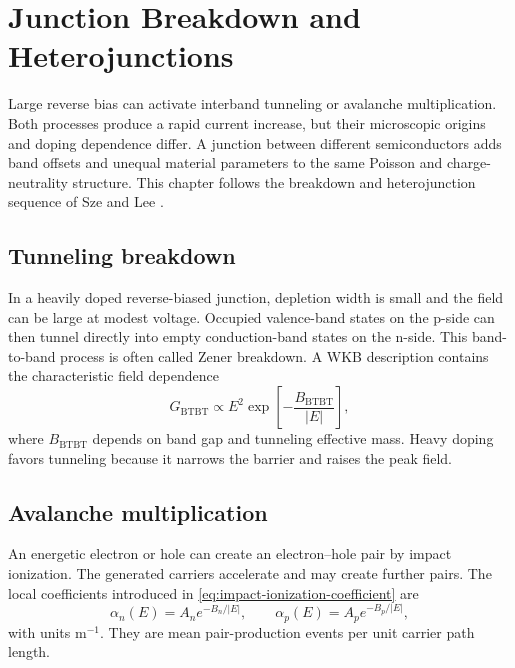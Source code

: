 \chapter{Junction Breakdown and Heterojunctions}
\label{ch:breakdown-heterojunctions}

Large reverse bias can activate interband tunneling or avalanche multiplication.
Both processes produce a rapid current increase, but their microscopic origins
and doping dependence differ.  A junction between different semiconductors adds
band offsets and unequal material parameters to the same Poisson and charge-
neutrality structure.  This chapter follows the breakdown and heterojunction
sequence of Sze and Lee \cite[Chap.~3, Secs.~3.6--3.7]{szeLee2012}.

\section{Tunneling breakdown}

In a heavily doped reverse-biased junction, depletion width is small and the
field can be large at modest voltage.  Occupied valence-band states on the
p-side can then tunnel directly into empty conduction-band states on the
n-side.  This band-to-band process is often called Zener breakdown.  A
WKB description contains the characteristic field dependence
\begin{equation}
 G_{\mathrm{BTBT}}\propto E^2
 \exp\left[-\frac{B_{\mathrm{BTBT}}}{|E|}\right],
 \label{eq:band-to-band-tunneling-generation}
\end{equation}
where $B_{\mathrm{BTBT}}$ depends on band gap and tunneling effective mass.
Heavy doping favors tunneling because it narrows the barrier and raises the
peak field.

\section{Avalanche multiplication}

An energetic electron or hole can create an electron--hole pair by impact
ionization.  The generated carriers accelerate and may create further pairs.
The local coefficients introduced in \cref{eq:impact-ionization-coefficient}
are
\begin{equation}
 \alpha_n(E)=A_n e^{-B_n/|E|},
 \qquad
 \alpha_p(E)=A_p e^{-B_p/|E|},
 \label{eq:junction-ionization-coefficients}
\end{equation}
with units $\mathrm{m^{-1}}$.  They are mean pair-production events per unit
carrier path length.

